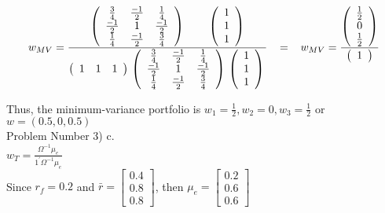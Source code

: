 \documentclass[11pt]{article}
\begin{document}
\[
w_{MV} =
\frac{
 \left( \begin{array}{ccc}
\frac{3}{4} & \frac{-1}{2} & \frac{1}{4} \\
\frac{-1}{2} & 1 & \frac{-1}{2} \\
\frac{1}{4} & \frac{-1}{2} & \frac{3}{4} \end{array} \right)
\\
\left( \begin{array}{ccc}
1 \\
1 \\
1 \end{array} \right)
}
{
\left( \begin{array}{ccc}
1 & 1 & 1 \end{array} \right)
\\
\left( \begin{array}{ccc}
\frac{3}{4} & \frac{-1}{2} & \frac{1}{4} \\
\frac{-1}{2} & 1 & \frac{-1}{2} \\
\frac{1}{4} & \frac{-1}{2} & \frac{3}{4} \end{array} \right)
\\
\left( \begin{array}{ccc}
1 \\
1 \\
1 \end{array} \right)
\\
}
\hspace{3mm}
=
\hspace{3mm}
w_{MV} =
\frac{
\left( \begin{array}{ccc}
\frac{1}{2} \\
0 \\
\frac{1}{2} \end{array} \right)
}
{
\left( \begin{array}{c}
1 \end{array} \right)
}
\]

Thus, the minimum-variance portfolio is $w_{1} = \frac{1}{2}, w_{2} = 0, w_{3} = \frac{1}{2}$ or $w = (0.5, 0, 0.5)$\\

Problem Number 3) c.\\
$w_{T} = \frac{\Omega^{-1}\mu_{e}}{1^{'}\Omega^{-1}\mu_{e}}$\\

Since $r_{f} = 0.2$ and $\bar{r} = [\begin{smallmatrix} 0.4\\ 0.8\\ 0.8 \end{smallmatrix}]$, then $\mu_{e} = [\begin{smallmatrix} 0.2\\ 0.6\\ 0.6 \end{smallmatrix}]$\\
\end{document}
